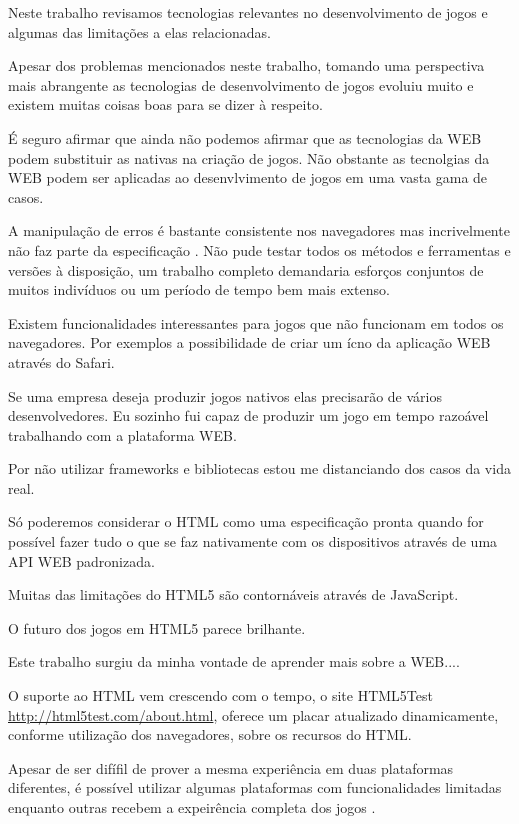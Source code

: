 \begin{draft}

Neste trabalho revisamos tecnologias relevantes no desenvolvimento de
jogos e algumas das limitações a elas relacionadas.

Apesar dos problemas mencionados neste trabalho, tomando uma perspectiva
mais abrangente as tecnologias de desenvolvimento de jogos evoluiu muito
e existem muitas coisas boas para se dizer à respeito.

É seguro afirmar que ainda não podemos afirmar que as tecnologias da
WEB podem substituir as nativas na criação de jogos. Não obstante as
tecnolgias da WEB podem ser aplicadas ao desenvlvimento de jogos em uma
vasta gama de casos.

A manipulação de erros é bastante consistente nos navegadores mas 
incrivelmente não faz parte da especificação \autocite{howBrowsersWork}.
Não pude testar todos os métodos e ferramentas e versões à
disposição, um trabalho completo demandaria esforços conjuntos de
muitos indivíduos ou um período de tempo bem mais extenso. 

Existem funcionalidades interessantes para jogos que não funcionam em
todos os navegadores. Por exemplos a possibilidade de criar um ícno da
aplicação WEB através do Safari.

Se uma empresa deseja produzir jogos nativos elas precisarão de vários
desenvolvedores. Eu sozinho fui capaz de produzir um jogo em tempo
razoável trabalhando com a plataforma WEB.

Por não utilizar frameworks e bibliotecas estou me distanciando
dos casos da vida real.

Só poderemos considerar o HTML como uma especificação pronta quando
for possível fazer tudo o que se faz nativamente com os dispositivos
através de uma API WEB padronizada.

Muitas das limitações do HTML5 são contornáveis através de JavaScript.

O futuro dos jogos em HTML5 parece brilhante.


Este trabalho surgiu da minha vontade de aprender mais sobre a WEB....

O suporte ao HTML vem crescendo com o tempo, o site HTML5Test
\url{http://html5test.com/about.html}, oferece um placar atualizado
dinamicamente, conforme utilização dos navegadores, sobre os recursos
do HTML.

Apesar de ser difífil de prover a mesma experiência em duas plataformas diferentes, é possível utilizar algumas plataformas com funcionalidades limitadas enquanto outras recebem a expeirência completa dos jogos \autocite[pp. 1]{currentStateCrossPlatform}.


\end{draft}
